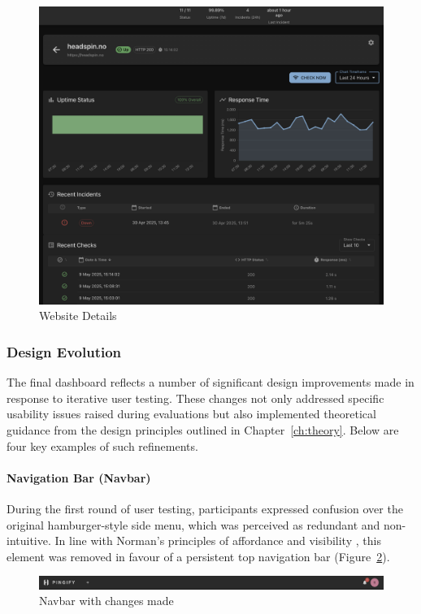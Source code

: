 \begin{figure}[H]
    \centering
    \includegraphics[width=1\linewidth]{figures/MVP-dashboard/MVP-websitedetails_full.png}
    \caption{Website Details}
    \label{fig:website_details_results}
\end{figure}

\subsubsection{Design Evolution}
The final dashboard reflects a number of significant design improvements made in response to iterative user testing. These changes not only addressed specific usability issues raised during evaluations but also implemented theoretical guidance from the design principles outlined in Chapter~\ref{ch:theory}. Below are four key examples of such refinements.

\paragraph{Navigation Bar (Navbar)}
During the first round of user testing, participants expressed confusion over the original hamburger-style side menu, which was perceived as redundant and non-intuitive. In line with Norman’s principles of affordance and visibility \parencite{sharp-2019}, this element was removed in favour of a persistent top navigation bar (Figure~\ref{fig:navbar}).

\begin{figure}[H]
    \centering
    \includegraphics[width=1\linewidth]{figures/navbar.png}
    \caption{Navbar with changes made}
    \label{fig:navbar}
\end{figure}

